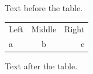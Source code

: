 \documentclass[12pt]{article}
\begin{document}
Text before the table.

\begin{tabular*}{\textwidth}{@{\extracolsep{\fill}}lcr}Left & Middle & Right\\a & b & c\end{tabular*}

Text after the table.
\end{document}
